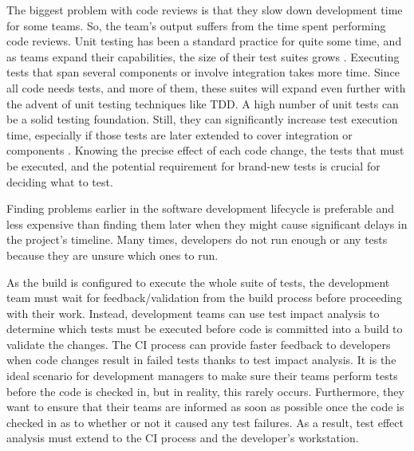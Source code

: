 The biggest problem with code reviews is that they slow down development time for some teams. So, the team's output suffers from the time spent performing code reviews. Unit testing has been a standard practice for quite some time, and as teams expand their capabilities, the size of their test suites grows \cite{ref20}. Executing tests that span several components or involve integration takes more time. Since all code needs tests, and more of them, these suites will expand even further with the advent of unit testing techniques like TDD. A high number of unit tests can be a solid testing foundation. Still, they can significantly increase test execution time, especially if those tests are later extended to cover integration or components \cite{ref21}. Knowing the precise effect of each code change, the tests that must be executed, and the potential requirement for brand-new tests is crucial for deciding what to test.\par 
Finding problems earlier in the software development lifecycle is preferable and less expensive than finding them later when they might cause significant delays in the project's timeline. Many times, developers do not run enough or any tests because they are unsure which ones to run. \par 
As the build is configured to execute the whole suite of tests, the development team must wait for feedback/validation from the build process before proceeding with their work. Instead, development teams can use test impact analysis to determine which tests must be executed before code is committed into a build to validate the changes. The CI process can provide faster feedback to developers when code changes result in failed tests thanks to test impact analysis. It is the ideal scenario for development managers to make sure their teams perform tests before the code is checked in, but in reality, this rarely occurs. Furthermore, they want to ensure that their teams are informed as soon as possible once the code is checked in as to whether or not it caused any test failures. As a result, test effect analysis must extend to the CI process and the developer's workstation.\par 

